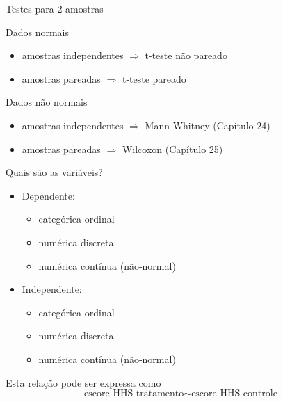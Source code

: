 \documentclass{beamer}
\begin{document}
\begin{frame}{Testes para 2 amostras}
  \begin{block}{Dados normais}
    \begin{itemize}
    \small
    \item amostras independentes $\Rightarrow$ t-teste não pareado
    \item amostras pareadas $\Rightarrow$ t-teste pareado
    \end{itemize}
  \end{block}
  \bigskip
  \begin{block}{Dados não normais}
    \begin{itemize}
    \small
    \item amostras independentes $\Rightarrow$ \alert{Mann-Whitney} {\footnotesize (Capítulo 24)}%
    \item amostras pareadas $\Rightarrow$ Wilcoxon {\footnotesize (Capítulo 25)}
    \end{itemize}
  \end{block}
\end{frame}

\begin{frame}{Quais são as variáveis?}
  \begin{itemize}
    \small
  \item Dependente:
    \begin{itemize}
      \footnotesize
    \item categórica ordinal
    \item numérica discreta
    \item numérica contínua (não-normal)
    \end{itemize}
  \item Independente:
    \begin{itemize}
      \footnotesize
    \item categórica ordinal
    \item numérica discreta
    \item numérica contínua (não-normal)
    \end{itemize}
  \end{itemize}
  \vfill
  \begin{block}{Esta relação pode ser expressa como}
    \small
    \begin{displaymath}
      \text{escore HHS tratamento} \sim \text{escore HHS controle}
    \end{displaymath}
  \end{block}
\end{frame}
\end{document}
